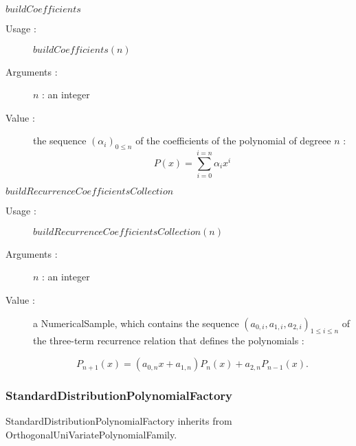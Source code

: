 \begin{description}
\begin{description}
  \item $buildCoefficients$
    \begin{description}
    \item[Usage :]  $buildCoefficients(n)$
    \item[Arguments :] $n$ : an integer
    \item[Value :]  the sequence $(\alpha_i)_{0 \leq n}$ of the coefficients of the polynomial of degreee $n$ : 
\begin{equation}\label{coefPol}
P(x) = \sum_{i=0}^{i=n} \alpha_i x^i
\end{equation}
    \end{description}
    \bigskip

  \item $buildRecurrenceCoefficientsCollection$
    \begin{description}
    \item[Usage :] $buildRecurrenceCoefficientsCollection(n)$
    \item[Arguments :] $n$ : an integer
    \item[Value :]  a NumericalSample, which contains the sequence $(a_{0,i}, a_{1,i},a_{2,i})_{1 \leq i \leq n}$ of the three-term recurrence relation that defines the polynomials :
 
\begin{equation}\label{recCoefPol}
P_{n+1}(x) = (a_{0,n}x+a_{1,n})P_n(x) + a_{2,n}P_{n-1}(x).
\end{equation}
    \end{description}

  \end{description}
\end{description}

\newpage
\subsubsection{StandardDistributionPolynomialFactory}

StandardDistributionPolynomialFactory inherits from OrthogonalUniVariatePolynomialFamily.

